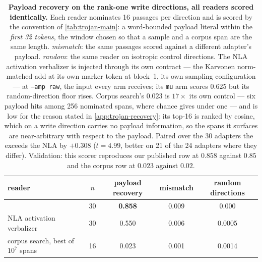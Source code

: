 \begin{table}[h]
\centering
\caption{\textbf{Payload recovery on the rank-one write directions, all readers scored identically.}
Each reader nominates 16 passages per direction and is scored by the convention of
\cref{tab:trojan-main}: a word-bounded payload literal within the \emph{first 32 tokens}, the window
chosen so that a sample and a corpus span are the same length. \emph{mismatch}: the same passages
scored against a different adapter's payload. \emph{random}: the same reader on isotropic control
directions. The NLA activation verbalizer is injected through its own contract --- the Karvonen
norm-matched add at its own marker token at block~1, its own sampling configuration --- at
\texttt{--amp raw}, the input every \method{} arm receives; its \texttt{mu} arm scores $0.625$ but
its random-direction floor rises. Corpus search's $0.023$ is $17\times$ its own control --- six
payload hits among 256 nominated spans, where chance gives under one --- and is low for the reason
stated in \cref{app:trojan-recovery}: its top-16 is ranked by cosine, which on a write direction
carries no payload information, so the spans it surfaces are near-arbitrary with respect to the
payload. Paired over the 30 adapters the \method{} exceeds the
NLA by $+0.308$ ($t=4.99$, better on 21 of the 24 adapters where they differ). Validation: this
scorer reproduces our published \method{} row at $0.858$ against $0.85$ and the corpus row at
$0.023$ against $0.02$.}
\label{tab:rebuttal-recovery}
\begin{tabular}{@{}lcccc@{}}
\toprule
reader & $n$ & payload recovery & mismatch & random directions \\
\midrule
\method{}                            & 30 & \textbf{0.858} & 0.009 & 0.000 \\
NLA activation verbalizer            & 30 & 0.550 & 0.006 & 0.0005 \\
corpus search, best of $10^7$ spans  & 16 & 0.023 & 0.001 & 0.0014 \\
\bottomrule
\end{tabular}
\end{table}

